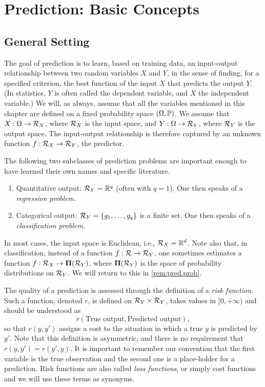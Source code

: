 \chapter{Prediction: Basic Concepts}
\label{chap:general}

\section{General Setting}
The goal of prediction is to learn, based on training data, an input-output relationship between two random variables $X$ and $Y$, in the sense of finding, for a specified criterion, the best function of the input $X$ that predicts  the output $Y$. (In statistics, $Y$ is often called the dependent variable, and $X$ the independent variable.) We will, as always, assume that all the variables mentioned in this chapter are defined on a fixed probability space $(\Omega, \bm{\mathbb P})$. We assume that $X: \Omega\to {\mathcal R}_X$, where ${\mathcal R}_X$ is the input space, and $Y: \Omega \to {\mathcal R}_Y$, where ${\mathcal R}_Y$ is the output space. The input-output relationship is therefore captured by an unknown function $f:{\mathcal R}_X\to{\mathcal R}_Y$, the predictor.

The following two subclasses of prediction problems are important enough to have learned their own names and specific literature.
\begin{enumerate}[label=$\bullet$,wide]
\item Quantitative output: ${\mathcal R}_Y = {\mathbb{R}}^q$ (often with $q=1$). One then speaks of a {\em regression problem}.
\item Categorical output: ${\mathcal R}_Y = \{g_1, \dots, g_q\}$ is a finite set. One then speaks of a {\em classification problem}.
\end{enumerate}
In most cases, the input space is Euclidean, i.e., ${\mathcal R}_X = {\mathbb{R}}^d$. Note also that, in classification, instead of a function $f: {\mathcal R} \to {\mathcal R}_Y$, one sometimes estimates a function $f:{\mathcal R}_X \to \bm\Pi({\mathcal R}_Y)$, where $\bm\Pi({\mathcal R}_Y)$ is the space of probability distributions on ${\mathcal R}_Y$. We will return to this in \cref{rem:pred.prob}.



The quality of a prediction is assessed through the definition of a {\em risk function}.
Such a function, denoted $r$, is defined on ${\mathcal R}_Y \times {\mathcal R}_Y$, takes values in $[0, +\infty)$ and should be understood as
\begin{equation}
\label{eq:risk.def}
r(\text{True output}, \text{Predicted output}),
\end{equation}
so that  $r(y,y')$ assigns a cost to the situation in which a true $y$ is predicted by $y'$. 
Note that this definition is asymmetric, and there is no requirement that $r(y,y') = r(y',y)$. It is important to remember our convention that the first variable is the true observation and the second one is a place-holder for a prediction.  
Risk functions are also called {\em loss functions}, or  simply {cost functions} and we will use these terms as synonyms.

